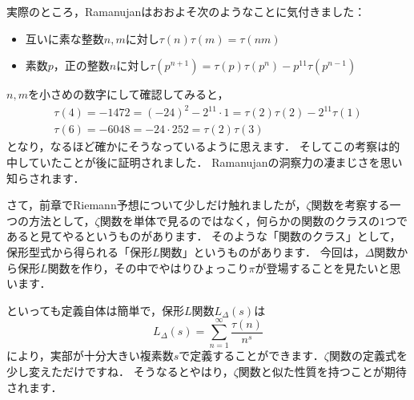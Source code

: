 実際のところ，Ramanujanはおおよそ次のようなことに気付きました：
\begin{itemize}
	\item 互いに素な整数$n,m$に対し$\tau(n)\tau(m)=\tau(nm)$
	\item 素数$p$，正の整数$n$に対し$\tau(p^{n+1})=\tau(p) \tau(p^{n})-p^{11}\tau(p^{n-1})$
\end{itemize}
$n,m$を小さめの数字にして確認してみると，
\begin{eqnarray*}
	\tau(4)=-1472=(-24)^2-2^{11} \cdot 1=\tau(2)\tau(2)-2^{11}\tau(1) \\
	\tau(6)=-6048=-24 \cdot 252 = \tau(2) \tau(3)
\end{eqnarray*}
となり，なるほど確かにそうなっているように思えます．
そしてこの考察は的中していたことが後に証明されました．
Ramanujanの洞察力の凄まじさを思い知らされます．

さて，前章でRiemann予想について少しだけ触れましたが，$\zeta$関数を考察する一つの方法として，$\zeta$関数を単体で見るのではなく，何らかの関数のクラスの$1$つであると見てやるというものがあります．
そのような「関数のクラス」として，保形型式から得られる「保形$L$関数」というものがあります．
今回は，$\Delta$関数から保形$L$関数を作り，その中でやはりひょっこり$\pi$が登場することを見たいと思います．

といっても定義自体は簡単で，保形$L$関数$L_{\Delta}(s)$は
\[
	L_{\Delta}(s)=\sum_{n=1}^{\infty}\frac {\tau (n)}{n^s}
\]
により，実部が十分大きい複素数$s$で定義することができます．$\zeta$関数の定義式を少し変えただけですね．
そうなるとやはり，$\zeta$関数と似た性質を持つことが期待されます．

